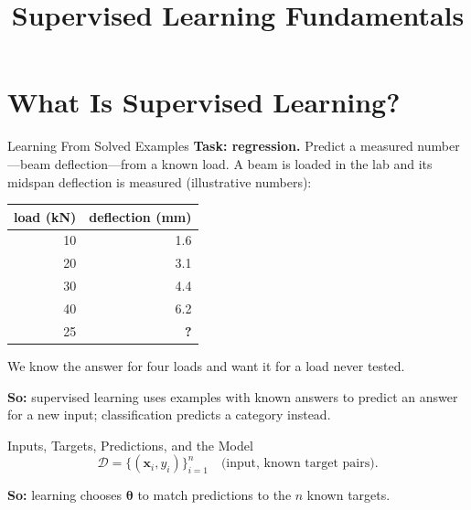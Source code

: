 \documentclass{ntuabeamer}
\title{Supervised Learning Fundamentals}
\author{}
\date{}
\newcommand{\takeaway}[1]{\par\vspace{0.3cm}\begingroup\raggedright\noindent
  {\color{courseblue}\textbf{So:}} #1\par\endgroup}
\begin{document}
\begin{frame}[plain]
  \makepresentationtitle
\end{frame}


\section{What Is Supervised Learning?}

\begin{frame}{Learning From Solved Examples}
  \textbf{Task: regression.} Predict a measured number---beam deflection---from a known load.
  A beam is loaded in the lab and its midspan deflection is measured
  (illustrative numbers):
  \begin{center}
    \begin{tabular}{rr}
      \toprule
      load (kN) & deflection (mm) \\
      \midrule
      10 & 1.6 \\
      20 & 3.1 \\
      30 & 4.4 \\
      40 & 6.2 \\
      \midrule
      25 & \textbf{?} \\
      \bottomrule
    \end{tabular}
  \end{center}
  We know the answer for four loads and want it for a load never tested.
  \takeaway{supervised learning uses examples with known answers to predict an answer for a new input; classification predicts a category instead.}
\end{frame}

\begin{frame}{Inputs, Targets, Predictions, and the Model}
  \[
    \mathcal D=\{(\mathbf x_i,y_i)\}_{i=1}^n
    \quad\text{(input, known target pairs).}
  \]
  \centering
  \raggedright
  \takeaway{learning chooses $\boldsymbol\theta$ to match predictions to the $n$ known targets.}
\end{frame}
\end{document}
